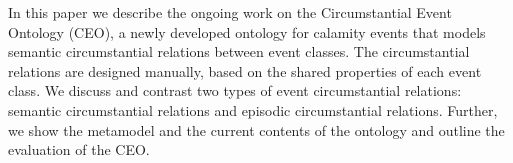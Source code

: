In this paper we describe the ongoing work on the Circumstantial Event Ontology (CEO), a newly developed ontology for calamity events that models semantic circumstantial relations between event classes. The circumstantial relations are designed manually, based on the shared properties of each event class. We discuss and contrast two types of event circumstantial relations: semantic circumstantial relations and episodic circumstantial relations. Further, we show the metamodel and the current contents of the ontology and outline the evaluation of the CEO.
